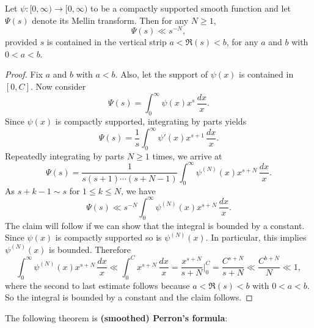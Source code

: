     \begin{proposition}\label{prop:smoothing_function_Mellin_inverse_vertical_strips}
      Let $\psi:[0,\infty) \to [0,\infty)$ to be a compactly supported smooth function and let $\Psi(s)$ denote its Mellin transform. Then for any $N \ge 1$,
      \[
        \Psi(s) \ll s^{-N},
      \]
      provided $s$ is contained in the vertical strip $a < \Re(s) < b$, for any $a$ and $b$ with $0 < a < b$.
    \end{proposition}
    \begin{proof}
      Fix $a$ and $b$ with $a < b$. Also, let the support of $\psi(x)$ is contained in $[0,C]$. Now consider
      \[
        \Psi(s) = \int_{0}^{\infty}\psi(x)x^{s}\,\frac{dx}{x}.
      \]
      Since $\psi(x)$ is compactly supported, integrating by parts yields
      \[
        \Psi(s) = \frac{1}{s}\int_{0}^{\infty}\psi'(x)x^{s+1}\,\frac{dx}{x}.
      \]
      Repeatedly integrating by parts $N \ge 1$ times, we arrive at
      \[
        \Psi(s) = \frac{1}{s(s+1) \cdots (s+N-1)}\int_{0}^{\infty}\psi^{(N)}(x)x^{s+N}\,\frac{dx}{x}.
      \]
      As $s+k-1 \sim s$ for $1 \le k \le N$, we have
      \[
        \Psi(s) \ll s^{-N}\int_{0}^{\infty}\psi^{(N)}(x)x^{s+N}\,\frac{dx}{x}.
      \]
      The claim will follow if we can show that the integral is bounded by a constant. Since $\psi(x)$ is compactly supported so is $\psi^{(N)}(x)$. In particular, this implies $\psi^{(N)}(x)$ is bounded. Therefore
      \[
        \int_{0}^{\infty}\psi^{(N)}(x)x^{s+N}\,\frac{dx}{x} \ll \int_{0}^{C}x^{s+N}\,\frac{dx}{x} = \frac{x^{s+N}}{s+N}\bigg|_{0}^{C} = \frac{C^{s+N}}{s+N} \ll \frac{C^{b+N}}{N} \ll 1,
      \]
      where the second to last estimate follows because $a < \Re(s) < b$ with $0 < a < b$. So the integral is bounded by a constant and the claim follows.
    \end{proof}
    
    The following theorem is \textbf{(smoothed) Perron's formula}:

